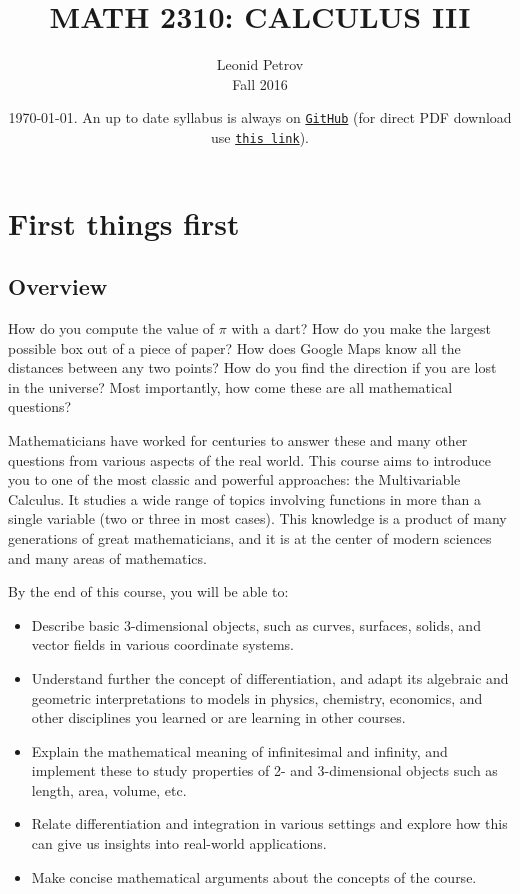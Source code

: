 \documentclass[oneside,11pt]{amsart}
\begin{document}
\title[MATH 2310: CALCULUS III]{MATH 2310: CALCULUS III}
\author{Leonid Petrov\\Fall 2016}
\date{\today. An up to date syllabus is always on \href{https://github.com/lenis2000/Syllabi/blob/master/Syllabus_2310_f16.pdf}{\texttt{GitHub}} (for direct PDF download use \href{https://github.com/lenis2000/Syllabi/raw/master/Syllabus_2310_f16.pdf}{\texttt{this link}}).}
\maketitle

\setcounter{tocdepth}{3}

\section{First things first}

\subsection{Overview}

How do you compute the value of $\pi$ with a dart? How do you make the largest possible box out of a piece of paper? How does Google Maps know all the distances between any two points? How do you find the direction if you are lost in the universe? Most importantly, how come these are all mathematical questions?

Mathematicians have worked for centuries to answer these and many other questions from various aspects of the real world. This course aims to introduce you to one of the most classic and powerful approaches: the Multivariable Calculus. It studies a wide range of topics involving functions in more than a single variable (two or three in most cases). This knowledge is a product of many generations of great mathematicians, and it is at the center of modern sciences and many areas of mathematics. 

By the end of this course, you will be able to:
\begin{itemize}
	\item 
	Describe basic 3-dimensional objects, such as curves, surfaces, solids, and vector fields in various coordinate systems.
	\item 
	Understand further the concept of differentiation, and adapt its algebraic and geometric interpretations to models in physics, chemistry, economics, and other disciplines you learned or are learning in other courses.
	\item 
	Explain the mathematical meaning of infinitesimal and infinity, and implement these to study properties of 2- and 3-dimensional objects such as length, area, volume, etc.
	\item 
	Relate differentiation and integration in various settings and explore how this can give us insights into real-world applications.
	\item 
	Make concise mathematical arguments about the concepts of the course.
\end{itemize}
\end{document}
